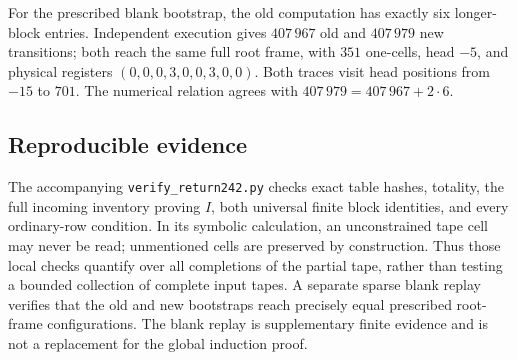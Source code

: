 For the prescribed blank bootstrap, the old computation has exactly six
longer-block entries.  Independent execution gives $407\,967$ old and
$407\,979$ new transitions; both reach the same full root frame, with
$351$ one-cells, head $-5$, and physical registers
$(0,0,0,3,0,0,3,0,0)$.  Both traces visit head positions from $-15$ to $701$.
The numerical relation agrees with $407\,979=407\,967+2\cdot6$.

\subsection{Reproducible evidence}

The accompanying \texttt{verify\_return242.py} checks exact table hashes,
totality, the full incoming inventory proving $I$, both universal finite
block identities, and every ordinary-row condition.  In its symbolic
calculation, an unconstrained tape cell may never be read; unmentioned cells
are preserved by construction.  Thus those local checks quantify over all
completions of the partial tape, rather than testing a bounded collection
of complete input tapes.  A separate sparse blank replay verifies that the
old and new bootstraps reach precisely equal prescribed root-frame configurations.
The blank replay is supplementary finite evidence and is not a replacement
for the global induction proof.

